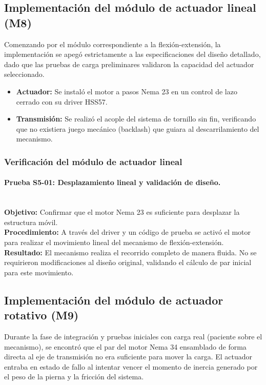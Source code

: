 \subsection{Implementación del módulo de actuador lineal (M8)}
Comenzando por el módulo correspondiente a la flexión-extensión, la implementación se apegó estrictamente a las especificaciones del diseño detallado, dado que las pruebas de carga preliminares validaron la capacidad del actuador seleccionado.
\begin{itemize}
	\item \textbf{Actuador:} Se instaló el motor a pasos Nema 23 en un control de lazo cerrado con su driver HSS57.
	\item \textbf{Transmisión:} Se realizó el acople del sistema de tornillo sin fin, verificando que no existiera juego mecánico (backlash) que guiara al descarrilamiento del mecanismo.
\end{itemize}

\subsubsection{Verificación del módulo de actuador lineal}
\paragraph*{Prueba S5-01: Desplazamiento lineal y validación de diseño.}\mbox{}\\
\textbf{Objetivo:} Confirmar que el motor Nema 23 es suficiente para desplazar la estructura móvil.
\\
\textbf{Procedimiento:} A través del driver y un código de prueba se activó el motor para realizar el movimiento lineal del mecanismo de flexión-extensión.
\\
\textbf{Resultado:} El mecanismo realiza el recorrido completo de manera fluida. No se requirieron modificaciones al diseño original, validando el cálculo de par inicial para este movimiento.

\subsection{Implementación del módulo de actuador rotativo (M9)}
Durante la fase de integración y pruebas iniciales con carga real (paciente sobre el mecanismo), se encontró que el par del motor Nema 34 ensamblado de forma directa al eje de transmisión no era suficiente para mover la carga. El actuador entraba en estado de fallo al intentar vencer el momento de inercia generado por el peso de la pierna y la fricción del sistema.

